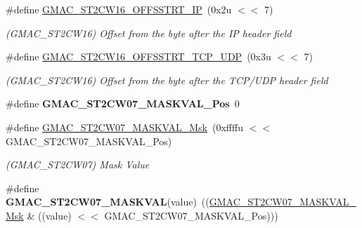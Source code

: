 \begin{DoxyCompactItemize}
\mbox{\label{group__SAMV71__GMAC_ga9ae3e85a4563be1569cbac26ee299275}} 
\#define \mbox{\hyperlink{group__SAMV71__GMAC_ga9ae3e85a4563be1569cbac26ee299275}{G\+M\+A\+C\+\_\+\+S\+T2\+C\+W16\+\_\+\+O\+F\+F\+S\+S\+T\+R\+T\+\_\+\+IP}}~(0x2u $<$$<$ 7)
\begin{DoxyCompactList}\small\item\em (G\+M\+A\+C\+\_\+\+S\+T2\+C\+W16) Offset from the byte after the IP header field \end{DoxyCompactList}\item 
\mbox{\label{group__SAMV71__GMAC_gae18a6da2881614087005a5ced938f337}} 
\#define \mbox{\hyperlink{group__SAMV71__GMAC_gae18a6da2881614087005a5ced938f337}{G\+M\+A\+C\+\_\+\+S\+T2\+C\+W16\+\_\+\+O\+F\+F\+S\+S\+T\+R\+T\+\_\+\+T\+C\+P\+\_\+\+U\+DP}}~(0x3u $<$$<$ 7)
\begin{DoxyCompactList}\small\item\em (G\+M\+A\+C\+\_\+\+S\+T2\+C\+W16) Offset from the byte after the T\+C\+P/\+U\+DP header field \end{DoxyCompactList}\item 
\mbox{\label{group__SAMV71__GMAC_ga9cb745b020ba6dda0fcd4e79466c1eae}} 
\#define {\bfseries G\+M\+A\+C\+\_\+\+S\+T2\+C\+W07\+\_\+\+M\+A\+S\+K\+V\+A\+L\+\_\+\+Pos}~0
\item 
\mbox{\label{group__SAMV71__GMAC_gaec7a742926e8d771dfb359cfc38959a0}} 
\#define \mbox{\hyperlink{group__SAMV71__GMAC_gaec7a742926e8d771dfb359cfc38959a0}{G\+M\+A\+C\+\_\+\+S\+T2\+C\+W07\+\_\+\+M\+A\+S\+K\+V\+A\+L\+\_\+\+Msk}}~(0xffffu $<$$<$ G\+M\+A\+C\+\_\+\+S\+T2\+C\+W07\+\_\+\+M\+A\+S\+K\+V\+A\+L\+\_\+\+Pos)
\begin{DoxyCompactList}\small\item\em (G\+M\+A\+C\+\_\+\+S\+T2\+C\+W07) Mask Value \end{DoxyCompactList}\item 
\mbox{\label{group__SAMV71__GMAC_ga1876c09ee0d84aaad328224e94017d7c}} 
\#define {\bfseries G\+M\+A\+C\+\_\+\+S\+T2\+C\+W07\+\_\+\+M\+A\+S\+K\+V\+AL}(value)~((\mbox{\hyperlink{group__SAMV71__GMAC_gaec7a742926e8d771dfb359cfc38959a0}{G\+M\+A\+C\+\_\+\+S\+T2\+C\+W07\+\_\+\+M\+A\+S\+K\+V\+A\+L\+\_\+\+Msk}} \& ((value) $<$$<$ G\+M\+A\+C\+\_\+\+S\+T2\+C\+W07\+\_\+\+M\+A\+S\+K\+V\+A\+L\+\_\+\+Pos)))

\end{DoxyCompactItemize}
